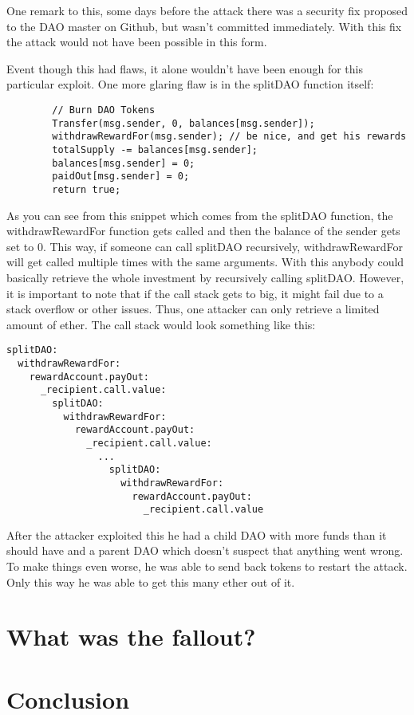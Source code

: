 \documentclass[a4paper, 11pt]{scrartcl}
\begin{document}
One remark to this, some days before the attack there was a security fix proposed to the DAO master on Github, but wasn't committed immediately. With this fix the attack would not have been possible in this form. \cite{securityFixPayout}

Event though this had flaws, it alone wouldn't have been enough for this particular exploit. One more glaring flaw is in the splitDAO function itself: \cite{deconstructingDaoAttack}

\begin{verbatim}
        // Burn DAO Tokens
        Transfer(msg.sender, 0, balances[msg.sender]);
        withdrawRewardFor(msg.sender); // be nice, and get his rewards
        totalSupply -= balances[msg.sender];
        balances[msg.sender] = 0;
        paidOut[msg.sender] = 0;
        return true;
\end{verbatim}

As you can see from this snippet which comes from the splitDAO function, the withdrawRewardFor function gets called and then the balance of the sender gets set to 0. This way, if someone can call splitDAO recursively, withdrawRewardFor will get called multiple times with the same arguments. With this anybody could basically retrieve the whole investment by recursively calling splitDAO. However, it is important to note that if the call stack gets to big, it might fail due to a stack overflow or other issues. Thus, one attacker can only retrieve a limited amount of ether. The call stack would look something like this: \cite{deconstructingDaoAttack}

\begin{verbatim}
splitDAO:
  withdrawRewardFor:
    rewardAccount.payOut:
      _recipient.call.value:
        splitDAO:
          withdrawRewardFor:
            rewardAccount.payOut:
              _recipient.call.value:
                ...  
                  splitDAO:
                    withdrawRewardFor:
                      rewardAccount.payOut:
                        _recipient.call.value
\end{verbatim}

After the attacker exploited this he had a child DAO with more funds than it should have and a parent DAO which doesn't suspect that anything went wrong. To make things even worse, he was able to send back tokens to restart the attack. Only this way he was able to get this many ether out of it. \cite{deconstructingDaoAttack}

\section{What was the fallout?}



\section{Conclusion}

\nocite{*}
\clearpage
\printbibliography[heading=bibintoc]
\end{document}
